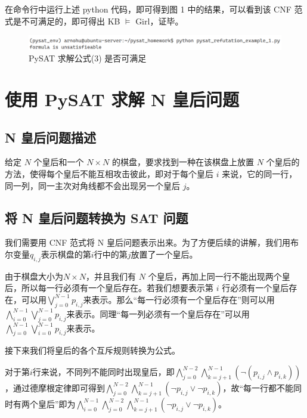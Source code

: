 \documentclass{article}
\begin{document}
在命令行中运行上述 python 代码，即可得到图 1 中的结果，可以看到该 CNF 范式是不可满足的，即可得出 KB $\models$ Girl，证毕。

\begin{figure}[h]
    \centering
    \includegraphics[width=1.0\textwidth]{figures/homework1_result.png}
    \caption{PySAT 求解公式(3) 是否可满足}
\end{figure}

\section{使用 PySAT 求解 N 皇后问题}

\subsection{N 皇后问题描述}

给定 $N$ 个皇后和一个 $N \times N$ 的棋盘，要求找到一种在该棋盘上放置 $N$ 个皇后的方法，使得每个皇后不能互相攻击彼此，即对于每个皇后 $i$ 来说，它的同一行，同一列，同一主次对角线都不会出现另一个皇后 $j$。

\subsection{将 N 皇后问题转换为 SAT 问题}

我们需要用 CNF 范式将 N 皇后问题表示出来。为了方便后续的讲解，我们用布尔变量$q_{i,j}$表示棋盘的第$i$行中的第$j$放置了一个皇后。

由于棋盘大小为$N \times N$，并且我们有 $N$ 个皇后，再加上同一行不能出现两个皇后，所以每一行必须有一个皇后存在。若我们想要表示第 $i$ 行必须有一个皇后存在，可以用$\bigvee_{j=0}^{N-1}p_{i,j}$来表示。那么“每一行必须有一个皇后存在”则可以用$\bigwedge_{i=0}^{N-1}\bigvee_{j=0}^{N-1}p_{i,j}$来表示。同理“每一列必须有一个皇后存在”可以用$\bigwedge_{j=0}^{N-1}\bigvee_{i=0}^{N-1}p_{i,j}$来表示。

接下来我们将皇后的各个互斥规则转换为公式。

对于第$i$行来说，不同列不能同时出现皇后，即$\bigwedge_{j=0}^{N-2}\bigwedge_{k=j+1}^{N-1}(\neg (p_{i,j} \wedge p_{i, k}))$，通过德摩根定律即可得到$\bigwedge_{j=0}^{N-2}\bigwedge_{k=j+1}^{N-1}(\neg p_{i,j} \vee \neg p_{i, k})$，故“每一行都不能同时有两个皇后”即为$\bigwedge_{i=0}^{N-1} \bigwedge_{j=0}^{N-2}\bigwedge_{k=j+1}^{N-1}(\neg p_{i,j} \vee \neg p_{i, k})$。
\end{document}
